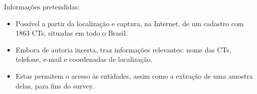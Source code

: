 

\begin{block}{Informações pretendidas:}
	
\begin{itemize}
	\item Possível a partir da localização e captura, na Internet, de um cadastro com 1863 CTs, situadas em todo o Brasil.
	\item Embora de autoria incerta, traz informações relevantes: nome das CTs, telefone, e-mail e coordenadas de localização.
	\item Estas permitem o acesso às entidades, assim como a extração de uma amostra delas, para fins do survey.
	\end{itemize}

\end{block}
